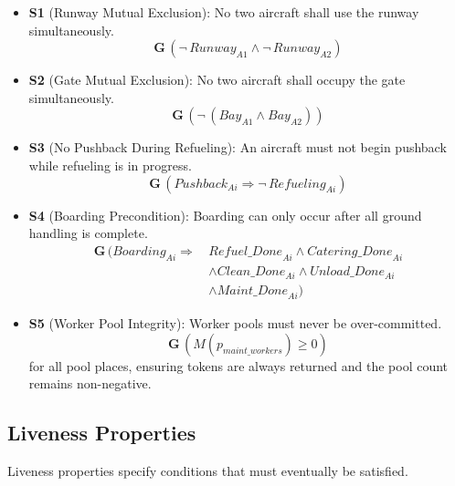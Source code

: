 \documentclass[conference]{IEEEtran}
\begin{document}
\begin{itemize}
  \item \textbf{S1} (Runway Mutual Exclusion): No two aircraft shall use the
    runway simultaneously.
    \[
      \mathbf{G}\,(\neg\,\mathit{Runway}_{A1} \wedge \neg\,\mathit{Runway}_{A2})
    \]

  \item \textbf{S2} (Gate Mutual Exclusion): No two aircraft shall occupy the
    gate simultaneously.
    \[
      \mathbf{G}\,(\neg\,(\mathit{Bay}_{A1} \wedge \mathit{Bay}_{A2}))
    \]

  \item \textbf{S3} (No Pushback During Refueling): An aircraft must not begin
    pushback while refueling is in progress.
    \[
      \mathbf{G}\,(\mathit{Pushback}_{Ai} \Rightarrow \neg\,\mathit{Refueling}_{Ai})
    \]

  \item \textbf{S4} (Boarding Precondition): Boarding can only occur after all
    ground handling is complete.
    \begin{align*}
      \mathbf{G}\,(\mathit{Boarding}_{Ai} \Rightarrow\, &\mathit{Refuel\_Done}_{Ai}
        \wedge \mathit{Catering\_Done}_{Ai}\\
        &\wedge \mathit{Clean\_Done}_{Ai} \wedge \mathit{Unload\_Done}_{Ai}\\
        &\wedge \mathit{Maint\_Done}_{Ai})
    \end{align*}

  \item \textbf{S5} (Worker Pool Integrity): Worker pools must never be
    over-committed.
    \[
      \mathbf{G}\,(M(p_{\mathit{maint\_workers}}) \geq 0)
    \]
    for all pool places, ensuring tokens are always returned and the pool count
    remains non-negative.
\end{itemize}

\subsection{Liveness Properties}

Liveness properties specify conditions that must eventually be satisfied.
\end{document}
